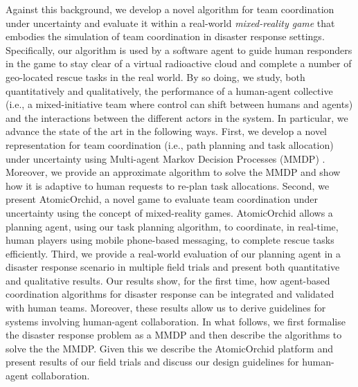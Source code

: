 Against this background, we develop a novel algorithm for team coordination under uncertainty and evaluate it within a real-world \emph{mixed-reality game} \cite{Fischer:etal:2012} that embodies the simulation of team coordination in disaster response settings. Specifically, our algorithm is used by a software agent to guide human responders in the game to stay clear of a virtual radioactive cloud and complete a number of geo-located rescue tasks in the real world. By so doing, we  study, both quantitatively and qualitatively, the performance of a human-agent collective (i.e., a mixed-initiative team where control can shift between humans and agents)  and the interactions between the different actors in the system. In particular, we  advance the state of the art in the following ways. First, we develop a novel representation for team coordination (i.e., path planning and task allocation) under uncertainty using Multi-agent Markov Decision Processes (MMDP)  \cite{boutilier1996planning}. Moreover, we provide an approximate algorithm to solve the MMDP and show how it  is adaptive to human requests to re-plan task allocations. Second, we present AtomicOrchid, a novel game to evaluate team coordination under uncertainty using the concept of mixed-reality games. AtomicOrchid allows a planning agent, using our task planning algorithm, to coordinate, in real-time, human players using mobile phone-based messaging, to complete rescue tasks efficiently. Third, we provide a real-world evaluation of our planning agent in a disaster response scenario in multiple field trials and present both quantitative and qualitative results. 
Our results show, for the first time, how agent-based coordination algorithms for disaster response can be integrated and validated with human teams. Moreover, these results allow us to derive  guidelines for systems involving  human-agent collaboration.  In what follows, we first formalise the disaster response problem as a MMDP and then describe the algorithms to solve the the MMDP. Given this we describe the AtomicOrchid platform and present results of our field trials and discuss our design guidelines for human-agent collaboration.\vspace{-2mm}





